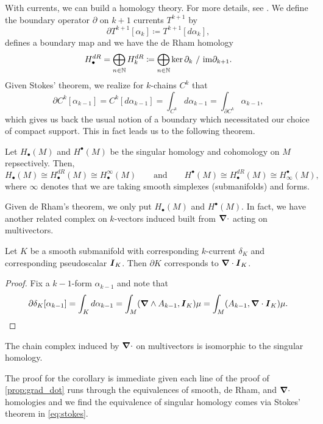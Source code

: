 \documentclass[conf]{new-aiaa}
\begin{document}
With currents, we can build a homology theory. For more details, see \cite{iversen_cauchy_1989}. We define the boundary operator $\partial$ on $k+1$ currents $T^{k+1}$ by
\begin{equation}
\partial T^{k+1}[\alpha_k] \coloneqq T^{k+1}[d\alpha_k],
\end{equation}
defines a boundary map and we have the de Rham homology
\begin{equation}
H_\bullet^{dR} = \bigoplus_{n\in \mathbb{N}} H_k^{dR} \coloneqq \bigoplus_{n\in \mathbb{N}} \ker \partial_k ~/~ \mathrm{im} \partial_{k+1}. 
\end{equation}
Given Stokes' theorem, we realize for $k$-chains $C^k$ that
\begin{equation}
\label{eq:stokes}
\partial C^k[\alpha_{k-1}] = C^k[d\alpha_{k-1}] = \int_{C^k} d\alpha_{k-1} = \int_{\partial C^k} \alpha_{k-1},
\end{equation}
which gives us back the usual notion of a boundary which necessitated our choice of compact support. This in fact leads us to the following theorem.
\begin{theorem}
    Let $H_\bullet(M)$ and $H^\bullet(M)$ be the singular homology and cohomology on $M$ repsectively. Then,
\begin{equation}
    H_\bullet(M)\cong H_\bullet^{dR}(M) \cong H_\bullet^\infty(M) \qquad \textrm{and} \qquad H^\bullet(M) \cong H_\bullet^{dR}(M) \cong H^\bullet_\infty(M),
\end{equation}
where $\infty$ denotes that we are taking smooth simplexes (submanifolds) and forms.
\end{theorem}
Given de Rham's theorem, we only put $H_\bullet(M)$ and $H^\bullet(M)$. In fact, we have another related complex on $k$-vectors induced built from $\boldsymbol{\nabla} \cdot$ acting on multivectors. 
\begin{proposition}
\label{prop:grad_dot}
    Let $K$ be a smooth submanifold with corresponding $k$-current $\delta_K$ and corresponding pseudoscalar $\boldsymbol{I}_K$. Then $\partial K$ corresponds to $\boldsymbol{\nabla} \cdot \boldsymbol{I}_K$.
\end{proposition}
\begin{proof}
Fix a $k-1$-form $\alpha_{k-1}$ and note that
\begin{align}
    \partial \delta_K [\alpha_{k-1}] = \int_K d\alpha_{k-1}= \int_M(\boldsymbol{\nabla} \wedge A_{k-1},\boldsymbol{I}_K)\mu = \int_M(A_{k-1},\boldsymbol{\nabla} \cdot \boldsymbol{I}_K) \mu.
\end{align}
\end{proof}
\begin{corollary}
    The chain complex induced by $\boldsymbol{\nabla} \cdot$ on multivectors is isomorphic to the singular homology. 
\end{corollary}
The proof for the corollary is immediate given each line of the proof of \cref{prop:grad_dot} runs through the equivalences of smooth, de Rham, and $\boldsymbol{\nabla} \cdot$ homologies and we find the equivalence of singular homology comes via Stokes' theorem in \cref{eq:stokes}.
\end{document}
